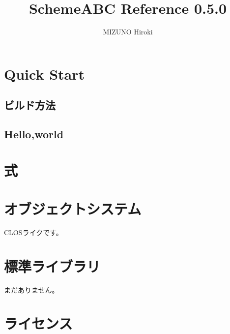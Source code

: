 \documentclass{article}
\begin{document}
\title{SchemeABC Reference 0.5.0}
\author{MIZUNO Hiroki}
\maketitle

\section{Quick Start}
\subsection{ビルド方法}
\subsection{Hello,world}

\section{式}

\section{オブジェクトシステム}
CLOSライクです。

\section{標準ライブラリ}
まだありません。
\section{ライセンス}
\end{document}
